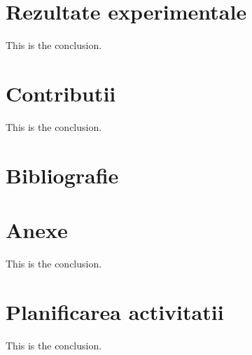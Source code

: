 \documentclass[titlepage,12pt]{article}
\begin{document}
\section{Rezultate experimentale}
This is the conclusion.

\section{Contributii}
This is the conclusion.

\section{Bibliografie}
\printbibliography
\clearpage

\section{Anexe}
This is the conclusion.

\section{Planificarea activitatii}
This is the conclusion.
\end{document}
